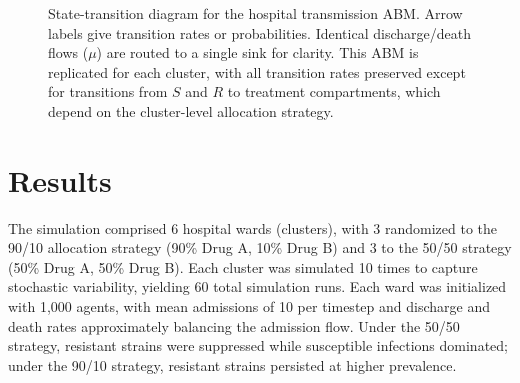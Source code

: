 \documentclass[preprint,11pt]{elsarticle}
\begin{document}
\begin{figure}[ht!]
  \caption{State-transition diagram for the hospital transmission ABM. Arrow labels give transition rates or probabilities. Identical discharge/death flows ($\mu$) are routed to a single sink for clarity. This ABM is replicated for each cluster, with all transition rates preserved except for transitions from $S$ and $R$ to treatment compartments, which depend on the cluster-level allocation strategy.}
  \label{fig:abm-diagram}
\end{figure}

\section{Results}

The simulation comprised 6 hospital wards (clusters), with 3 randomized to the 90/10 allocation strategy (90\% Drug A, 10\% Drug B) and 3 to the 50/50 strategy (50\% Drug A, 50\% Drug B). Each cluster was simulated 10 times to capture stochastic variability, yielding 60 total simulation runs. Each ward was initialized with 1,000 agents, with mean admissions of 10 per timestep and discharge and death rates approximately balancing the admission flow. Under the 50/50 strategy, resistant strains were suppressed while susceptible infections dominated; under the 90/10 strategy, resistant strains persisted at higher prevalence.
\end{document}
